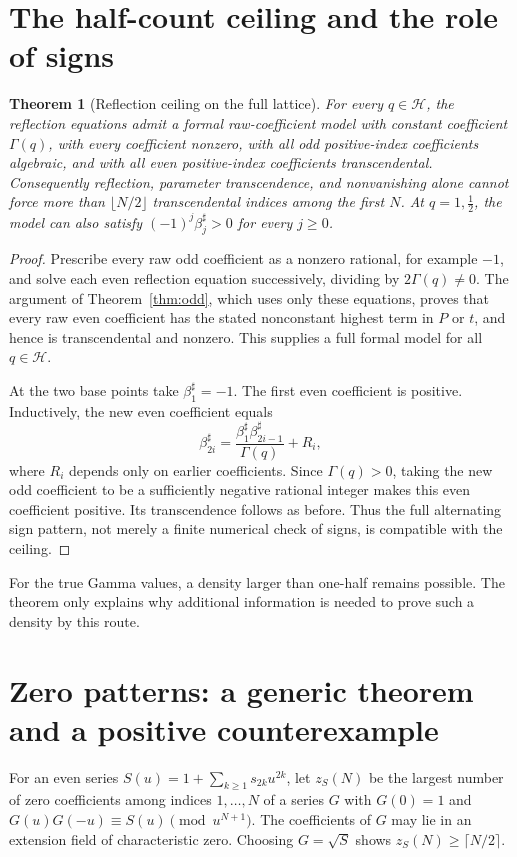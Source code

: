 \documentclass[11pt,a4paper]{article}
\newtheorem{theorem}{Theorem}[section]
\theoremstyle{definition}\newtheorem{definition}[theorem]{Definition}
\theoremstyle{remark}\newtheorem{remark}[theorem]{Remark}
\begin{document}
\section{The half-count ceiling and the role of signs}\label{sec:ceiling}
\begin{theorem}[Reflection ceiling on the full lattice]\label{thm:ceiling}
For every $q\in\mathcal H$, the reflection equations admit a formal raw-coefficient model with constant coefficient $\Gamma(q)$, with every coefficient nonzero, with all odd positive-index coefficients algebraic, and with all even positive-index coefficients transcendental. Consequently reflection, parameter transcendence, and nonvanishing alone cannot force more than $\lfloor N/2\rfloor$ transcendental indices among the first $N$.
At $q=1,\tfrac12$, the model can also satisfy $(-1)^j\beta_j^\sharp>0$ for every $j\ge0$.
\end{theorem}
\begin{proof}
Prescribe every raw odd coefficient as a nonzero rational, for example $-1$, and solve each even reflection equation successively, dividing by $2\Gamma(q)\ne0$. The argument of Theorem~\ref{thm:odd}, which uses only these equations, proves that every raw even coefficient has the stated nonconstant highest term in $P$ or $t$, and hence is transcendental and nonzero. This supplies a full formal model for all $q\in\mathcal H$.

At the two base points take $\beta_1^\sharp=-1$. The first even coefficient is positive. Inductively, the new even coefficient equals
\[
\beta_{2i}^\sharp=\frac{\beta_1^\sharp\beta_{2i-1}^\sharp}{\Gamma(q)}+R_i,
\]
where $R_i$ depends only on earlier coefficients. Since $\Gamma(q)>0$, taking the new odd coefficient to be a sufficiently negative rational integer makes this even coefficient positive. Its transcendence follows as before. Thus the full alternating sign pattern, not merely a finite numerical check of signs, is compatible with the ceiling.
\end{proof}
For the true Gamma values, a density larger than one-half remains possible. The theorem only explains why additional information is needed to prove such a density by this route.
\section{Zero patterns: a generic theorem and a positive counterexample}\label{sec:zero}
For an even series $S(u)=1+\sum_{k\ge1}s_{2k}u^{2k}$, let $z_S(N)$ be the largest number of zero coefficients among indices $1,\ldots,N$ of a series $G$ with
$G(0)=1$ and $G(u)G(-u)\equiv S(u)\pmod{u^{N+1}}$.
The coefficients of $G$ may lie in an extension field of characteristic zero. Choosing $G=\sqrt S$ shows $z_S(N)\ge\lceil N/2\rceil$.
\end{document}
